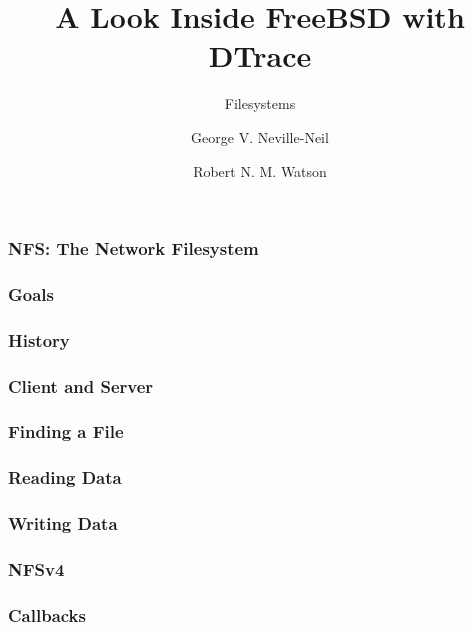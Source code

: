 \documentclass[pdftex]{beamer}
\begin{document}

\title{A Look Inside FreeBSD with DTrace}
\subtitle{Filesystems}
\author[shortname]{George V. Neville-Neil \and Robert N. M. Watson}

\begin{frame}
  \frametitle{NFS: The Network Filesystem}
\end{frame}

\begin{frame}
  \frametitle{Goals}
  
\end{frame}

\begin{frame}
  \frametitle{History}
  
\end{frame}

\begin{frame}
  \frametitle{Client and Server}
  
\end{frame}

\begin{frame}
  \frametitle{Finding a File}
  
\end{frame}

\begin{frame}
  \frametitle{Reading Data}
  
\end{frame}

\begin{frame}
  \frametitle{Writing Data}
  
\end{frame}

\begin{frame}
  \frametitle{NFSv4}
  
\end{frame}

\begin{frame}
  \frametitle{Callbacks}
  
\end{frame}
\end{document}
